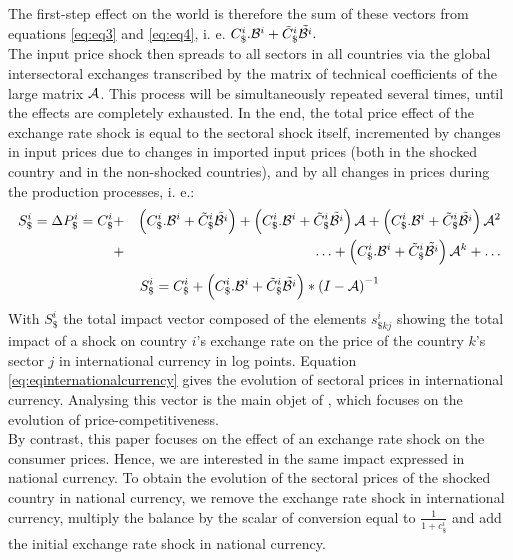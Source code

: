 \documentclass[12pt,a4paper]{paper}
\begin{document}
The first-step effect on the world is therefore the sum of these vectors from equations  \ref{eq:eq3} and \ref{eq:eq4}, i. e. $C_\$^i.{\cal B}^i+{\tilde{C}_\$^i}{\tilde{{\cal B}^i}}.~$\\
The input price shock then spreads to all sectors in all countries via the global intersectoral exchanges transcribed by the matrix of technical coefficients of the large matrix $\cal {A}$. This process will be simultaneously repeated several times, until the effects are completely exhausted.
In the end, the total price effect of the exchange rate shock is equal to the sectoral shock itself, incremented by changes in input prices due to changes in imported input prices (both in the shocked country and in the non-shocked countries), and by all changes in prices during the production processes, i. e.:\\
\begin{eqnarray*}
S_\$^i = \Delta{{P}_{\$}^i}=C_\$^i&+& \left(C_\$^i.{\cal B}^i+{\tilde{C}_\$^i}{\tilde{{\cal B}^ i}}\right)+ \left(C_\$^i.{\cal B}^i+{\tilde{C}_\$^i}{\tilde{{\cal B}^i}}\right){{\cal A}}+\left(C_\$^i.{\cal B}^i+{\tilde{C}_\$^i}{\tilde{{\cal B}^i}}\right){{\cal A}^{2}} \\
&+&\ldots+\left(C_\$^i.{\cal B}^i+{\tilde{C}_\$^i}{\tilde{{\cal B}^i}}\right){\cal A}^k +\ldots \\
\end{eqnarray*}
 \begin{eqnarray}
S_\$^i=C_\$^i+\left(C_\$^i.{\cal B}^i+{\tilde{C}_\$^i}{\tilde{{\cal B}^i}}\right)*{{(I-{\cal A})}^{-1}}	
\label{eq:eqinternationalcurrency}
 \end{eqnarray}
With $S_\$^i$ the total impact vector composed of the elements ${{{s}}^i_{\$kj}}$ showing the total impact of a shock on country $i$'s exchange rate on the price of the country $k$'s sector $j$ in international currency in log points. 
Equation \ref{eq:eqinternationalcurrency} gives the evolution of sectoral prices in international currency. Analysing this vector is the main objet of \cite{Cochard2016}, which focuses on the evolution of price-competitiveness.\\
By contrast, this paper focuses on the effect of an exchange rate shock on the consumer prices. Hence, we are interested in the same impact expressed in national currency. To obtain the evolution of the sectoral prices of the shocked country in national currency, we remove the exchange rate shock in international currency, multiply the balance by the scalar of conversion equal to $\frac{1}{1+c_\$^i}$ and add the initial exchange rate shock in national currency.
\end{document}
